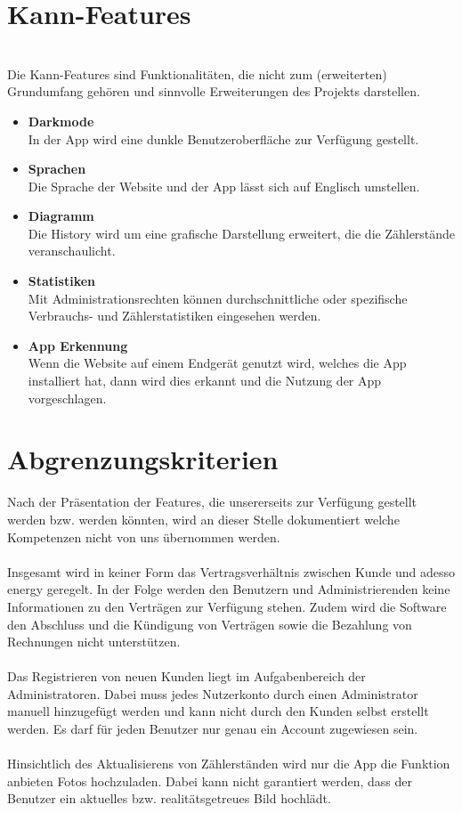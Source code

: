 \section{Kann-Features} \hfill \\
Die Kann-Features sind Funktionalitäten, die nicht zum (erweiterten) Grundumfang gehören und sinnvolle Erweiterungen des Projekts darstellen.
\begin{itemize}
\item  \textbf{Darkmode} \hfill \\
	In der App wird eine dunkle Benutzeroberfläche zur Verfügung gestellt.
\item \textbf{Sprachen} \hfill \\
	Die Sprache der Website und der App lässt sich auf Englisch umstellen.
\item \textbf{Diagramm} \hfill \\
	Die History wird um eine grafische Darstellung erweitert, die die Zählerstände veranschaulicht. 
\item \textbf{Statistiken} \hfill \\
	Mit Administrationsrechten können durchschnittliche oder spezifische Verbrauchs- und Zählerstatistiken eingesehen werden.
\item \textbf{App Erkennung} \hfill \\
	Wenn die Website auf einem Endgerät genutzt wird, welches die App installiert hat, dann wird dies erkannt und
	die Nutzung der App vorgeschlagen.
\end{itemize}

\section{Abgrenzungskriterien}

Nach der Präsentation der Features, die unsererseits zur Verfügung gestellt werden bzw. werden könnten, wird an dieser Stelle dokumentiert welche Kompetenzen nicht von uns übernommen werden. \\\\
Insgesamt wird in keiner Form das Vertragsverhältnis zwischen Kunde und adesso energy geregelt. 
In der Folge werden den Benutzern und Administrierenden keine Informationen zu den Verträgen zur Verfügung stehen. Zudem wird die Software den Abschluss und die Kündigung von Verträgen sowie die Bezahlung von Rechnungen nicht unterstützen. \\\\
Das Registrieren von neuen Kunden liegt im Aufgabenbereich der Administratoren. Dabei muss jedes Nutzerkonto durch einen Administrator manuell hinzugefügt werden und kann nicht durch den Kunden selbst erstellt werden. Es darf für jeden Benutzer nur genau ein Account zugewiesen sein.\\\\
Hinsichtlich des Aktualisierens von Zählerständen wird nur die App die Funktion anbieten Fotos hochzuladen. Dabei kann nicht garantiert werden, dass der Benutzer ein aktuelles bzw. realitätsgetreues Bild hochlädt.

